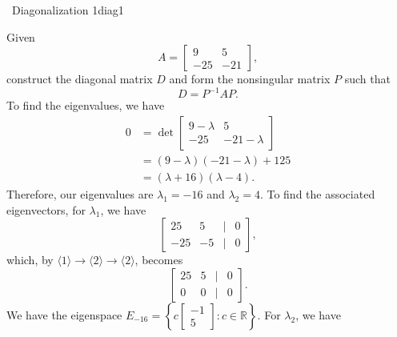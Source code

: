         \begin{example}{\Difficulty\,\Difficulty\,\,Diagonalization 1}{diag1}

            Given
            \begin{equation*}
                A=\begin{bmatrix}
                    9 & 5 \\ 
                    -25 & -21
                \end{bmatrix},
            \end{equation*}
            construct the diagonal matrix \(D\) and form the nonsingular matrix \(P\) such that
            \begin{equation*}
                D=P^{-1}AP.
            \end{equation*}
            To find the eigenvalues, we have
            \begin{align*}
                0&=\det\begin{bmatrix}
                    9-\lambda & 5 \\
                    -25 & -21-\lambda
                \end{bmatrix} \\
                &=(9-\lambda)(-21-\lambda)+125 \\
                &=(\lambda+16)(\lambda-4).
            \end{align*}
            Therefore, our eigenvalues are \(\lambda_1=-16\) and \(\lambda_2=4\). To find the associated eigenvectors, for \(\lambda_1\), we have
            \begin{equation*}
                \begin{bmatrix}
                    25 & 5 & | & 0 \\
                    -25 & -5 & | & 0
                \end{bmatrix},
            \end{equation*}
            which, by \(\langle1\rangle\to\langle2\rangle\to\langle2\rangle\), becomes
            \begin{equation*}
                \begin{bmatrix}
                    25 & 5 & | & 0 \\
                    0 & 0 & | & 0
                \end{bmatrix}.
            \end{equation*}
            We have the eigenspace \(E_{-16}=\left\{c\begin{bmatrix} -1 \\ 5 \end{bmatrix}:c\in\mathbb{R}\right\}\). For \(\lambda_2\), we have

\end{example}
